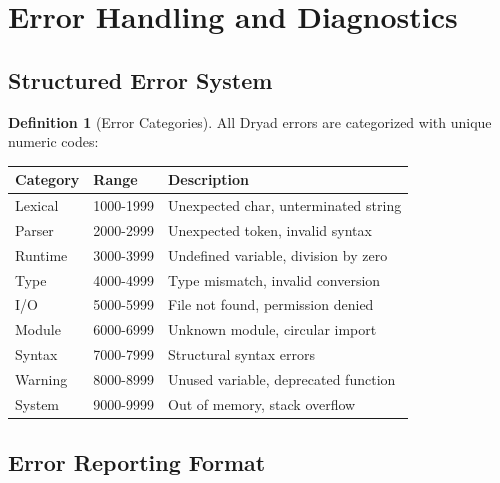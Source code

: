 \documentclass[12pt,a4paper]{article}
\theoremstyle{definition}
\newtheorem{definition}{Definition}[section]
\begin{document}
\newpage

\section{Error Handling and Diagnostics}

\subsection{Structured Error System}

\begin{definition}[Error Categories]
All Dryad errors are categorized with unique numeric codes:

\begin{center}
\begin{tabular}{|l|l|l|}
\hline
\textbf{Category} & \textbf{Range} & \textbf{Description} \\
\hline
Lexical & 1000-1999 & Unexpected char, unterminated string \\
Parser & 2000-2999 & Unexpected token, invalid syntax \\
Runtime & 3000-3999 & Undefined variable, division by zero \\
Type & 4000-4999 & Type mismatch, invalid conversion \\
I/O & 5000-5999 & File not found, permission denied \\
Module & 6000-6999 & Unknown module, circular import \\
Syntax & 7000-7999 & Structural syntax errors \\
Warning & 8000-8999 & Unused variable, deprecated function \\
System & 9000-9999 & Out of memory, stack overflow \\
\hline
\end{tabular}
\end{center}
\end{definition}

\subsection{Error Reporting Format}
\end{document}
